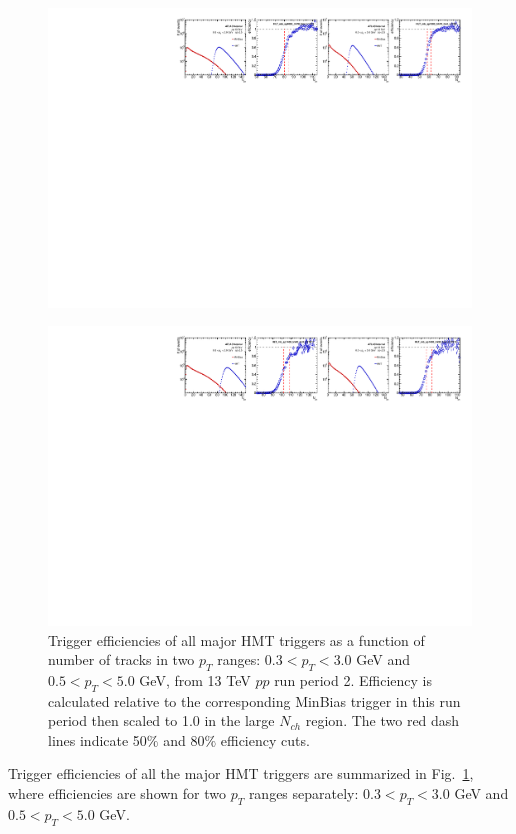 \begin{figure}[H]
\centering
\includegraphics[width=1.\linewidth]{figs/sec_evtSlc/trigEff_pp13_run2/trigEff_Trig22.pdf}
\end{figure}
\begin{figure}[H]
\centering
\includegraphics[width=1.\linewidth]{figs/sec_evtSlc/trigEff_pp13_run2/trigEff_Trig24.pdf}
\caption{Trigger efficiencies of all major HMT triggers as a function of number of tracks in two $p_{T}$ ranges: $0.3<p_{T}<3.0$ GeV and $0.5<p_{T}<5.0$ GeV, from 13 TeV $pp$ run period 2. Efficiency is calculated relative to the corresponding MinBias trigger in this run period then scaled to 1.0 in the large $N_{ch}$ region. The two red dash lines indicate 50$\%$ and 80$\%$ efficiency cuts.}
\label{fig:trigEff_pp13_run2}
\end{figure}
Trigger efficiencies of all the major HMT triggers are summarized in Fig.~\ref{fig:trigEff_pp13_run2}, where efficiencies are shown for two $p_{T}$ ranges separately: $0.3<p_{T}<3.0$ GeV and $0.5<p_{T}<5.0$ GeV.



